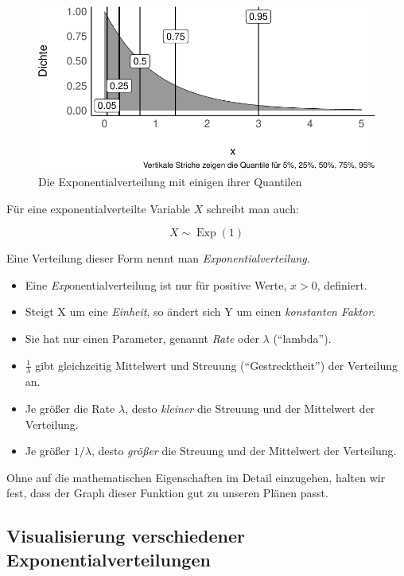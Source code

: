 \documentclass[
  a4paper,
  DIV=11]{scrreprt}
\providecommand{\tightlist}{%
  \setlength{\itemsep}{0pt}\setlength{\parskip}{0pt}}\usepackage{longtable,booktabs,array}
\theoremstyle{definition}
\theoremstyle{remark}
\begin{document}
\begin{figure}[H]

{\centering \includegraphics{./gauss_files/figure-pdf/fig-exp-1.pdf}

}

\caption{\label{fig-exp}Die Exponentialverteilung mit einigen ihrer
Quantilen}

\end{figure}

Für eine exponentialverteilte Variable \(X\) schreibt man auch:

\[X \sim \operatorname{Exp}(1)\]

Eine Verteilung dieser Form nennt man \emph{Exponentialverteilung}.

\begin{itemize}
\tightlist
\item
  Eine \emph{Exp}onentialverteilung ist nur für positive Werte, \(x>0\),
  definiert.
\item
  Steigt X um eine \emph{Einheit}, so ändert sich Y um einen
  \emph{konstanten Faktor}.
\item
  Sie hat nur einen Parameter, genannt \emph{Rate} oder \(\lambda\)
  (``lambda'').
\item
  \(\frac{1}{\lambda}\) gibt gleichzeitig Mittelwert und Streuung
  (``Gestrecktheit'') der Verteilung an.
\item
  Je größer die Rate \(\lambda\), desto \emph{kleiner} die Streuung und
  der Mittelwert der Verteilung.
\item
  Je größer \(1/\lambda\), desto \emph{größer} die Streuung und der
  Mittelwert der Verteilung.
\end{itemize}

Ohne auf die mathematischen Eigenschaften im Detail einzugehen, halten
wir fest, dass der Graph dieser Funktion gut zu unseren Plänen passt.

\hypertarget{visualisierung-verschiedener-exponentialverteilungen}{%
\subsection{Visualisierung verschiedener
Exponentialverteilungen}\label{visualisierung-verschiedener-exponentialverteilungen}}
\end{document}
